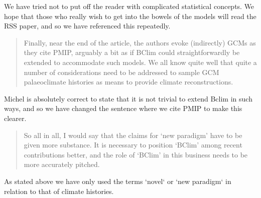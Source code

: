 \documentclass[a4paper,11pt]{article}
\begin{document}
We have tried not to put off the reader with complicated statistical concepts. We hope that those who really wish to get into the bowels of the models will read the RSS paper, and so we have referenced this repeatedly.

\begin{framed} \begin{quote}
Finally, near the end of the article, the authors evoke (indirectly) GCMs as they cite PMIP, arguably a bit as if BClim could straightforwardly be extended to accommodate such models. We all know quite well that quite a number of considerations need to be addressed to sample GCM palaeoclimate histories as means to provide climate reconstructions. 
\end{quote} \end{framed}

Michel is absolutely correct to state that it is not trivial to extend Bclim in such ways, and so we have changed the sentence where we cite PMIP to make this clearer. 

\begin{framed} \begin{quote}
So all in all, I would say that the claims for `new paradigm' have to be given more substance. It is necessary to position `BClim' among recent contributions better, and the role of `BClim' in this business needs to be more accurately pitched.  
\end{quote} \end{framed}

As stated above we have only used the terms `novel` or `new paradigm` in relation to that of climate histories. 
\end{document}
